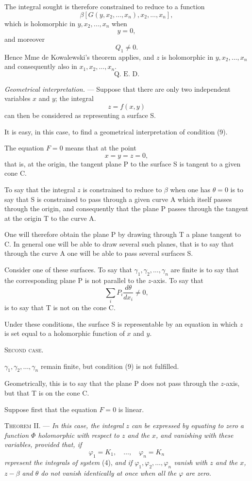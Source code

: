 \documentclass[11pt]{article}
\begin{document}
The integral sought is therefore constrained to reduce to a function
\[
\beta[G(y,x_2,\ldots,x_n),x_2,\ldots,x_n],
\]
which is holomorphic in $y,x_2,\ldots,x_n$ when
\[
y=0,
\]
and moreover
\[
Q_1\ne0.
\]
Hence Mme de Kowalewski's theorem applies, and $z$ is holomorphic in $y,x_2,\ldots,x_n$ and consequently also in $x_1,x_2,\ldots,x_n$.
\[
\text{Q. E. D.}
\]

\emph{Geometrical interpretation.} — Suppose that there are only two independent variables $x$ and $y$; the integral
\[
z=f(x,y)
\]
can then be considered as representing a surface S.

It is easy, in this case, to find a geometrical interpretation of condition (9).

The equation $F=0$ means that at the point
\[
x=y=z=0,
\]
that is, at the origin, the tangent plane P to the surface S is tangent to a given cone C.

To say that the integral $z$ is constrained to reduce to $\beta$ when one has $\theta=0$ is to say that S is constrained to pass through a given curve A which itself passes through the origin, and consequently that the plane P passes through the tangent at the origin T to the curve A.

One will therefore obtain the plane P by drawing through T a plane tangent to C. In general one will be able to draw several such planes, that is to say that through the curve A one will be able to pass several surfaces S.

Consider one of these surfaces. To say that $\gamma_1,\gamma_2,\ldots,\gamma_n$ are finite is to say that the corresponding plane P is not parallel to the $z$-axis. To say that
\[
\sum_i P_i\frac{d\theta}{dx_i}\ne0,
\]
is to say that T is not on the cone C.

Under these conditions, the surface S is representable by an equation in which $z$ is set equal to a holomorphic function of $x$ and $y$.

\begin{center}
\textsc{Second case.}
\end{center}

$\gamma_1,\gamma_2,\ldots,\gamma_n$ remain finite, but condition (9) is not fulfilled.

Geometrically, this is to say that the plane P does not pass through the $z$-axis, but that T is on the cone C.

Suppose first that the equation $F=0$ is linear.

\medskip
\noindent\textsc{Theorem II.} — \emph{In this case, the integral $z$ can be expressed by equating to zero a function $\Phi$ holomorphic with respect to $z$ and the $x$, and vanishing with these variables, provided that, if}
\[
\varphi_1=K_1,\quad \ldots,\quad \varphi_n=K_n
\]
\emph{represent the integrals of system} (4), \emph{and if $\varphi_1,\varphi_2,\ldots,\varphi_n$ vanish with $z$ and the $x$, $z-\beta$ and $\theta$ do not vanish identically at once when all the $\varphi$ are zero.}
\end{document}
